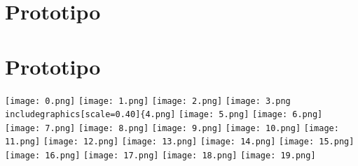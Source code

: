 \documentclass[11pt]{article}
\begin{document}
\section{Prototipo}
\section{Prototipo}
\texttt{[image: 0.png]}
\texttt{[image: 1.png]}
\texttt{[image: 2.png]}
\texttt{[image: 3.png
\\includegraphics[scale=0.40]\{4.png]}
\texttt{[image: 5.png]}
\texttt{[image: 6.png]}
\texttt{[image: 7.png]}
\texttt{[image: 8.png]}
\texttt{[image: 9.png]}
\texttt{[image: 10.png]}
\texttt{[image: 11.png]}
\texttt{[image: 12.png]}
\texttt{[image: 13.png]}
\texttt{[image: 14.png]}
\texttt{[image: 15.png]}
\texttt{[image: 16.png]}
\texttt{[image: 17.png]}
\texttt{[image: 18.png]}
\texttt{[image: 19.png]}
\end{document}
